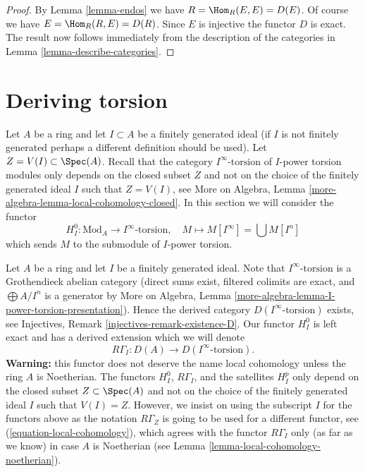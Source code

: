 \begin{proof}
By Lemma \ref{lemma-endos} we have $R = \Hom_R(E, E) = D(E)$.
Of course we have $E = \Hom_R(R, E) = D(R)$. Since $E$ is injective
the functor $D$ is exact. The result now follows immediately from the
description of the categories in
Lemma \ref{lemma-describe-categories}.
\end{proof}




















\section{Deriving torsion}
\label{section-bad-local-cohomology}

\noindent
Let $A$ be a ring and let $I \subset A$ be a finitely generated ideal
(if $I$ is not finitely generated perhaps a different definition
should be used). Let $Z = V(I) \subset \Spec(A)$. Recall that the
category $I^\infty\text{-torsion}$ of $I$-power torsion modules
only depends on the closed subset $Z$ and not on the choice of the
finitely generated ideal $I$ such that $Z = V(I)$, see
More on Algebra, Lemma \ref{more-algebra-lemma-local-cohomology-closed}.
In this section we will consider the functor
$$
H^0_{I} : \text{Mod}_A \longrightarrow I^\infty\text{-torsion},\quad
M \longmapsto M[I^\infty] = \bigcup M[I^n]
$$
which sends $M$ to the submodule of $I$-power torsion.

\medskip\noindent
Let $A$ be a ring and let $I$ be a finitely generated ideal.
Note that $I^\infty\text{-torsion}$ is a Grothendieck
abelian category (direct sums exist, filtered colimits are
exact, and $\bigoplus A/I^n$ is a generator by
More on Algebra, Lemma \ref{more-algebra-lemma-I-power-torsion-presentation}).
Hence the derived category $D(I^\infty\text{-torsion})$ exists, see
Injectives, Remark \ref{injectives-remark-existence-D}.
Our functor $H^0_I$ is left exact and has a derived extension
which we will denote
$$
R\Gamma_I : D(A) \longrightarrow D(I^\infty\text{-torsion}).
$$
{\bf Warning:} this functor does not deserve the name
local cohomology unless the ring $A$ is Noetherian.
The functors $H^0_I$, $R\Gamma_I$, and the satellites $H^p_I$
only depend on the closed subset $Z \subset \Spec(A)$ and not
on the choice of the finitely generated ideal $I$ such that
$V(I) = Z$. However, we insist on using the subscript $I$ for
the functors above as the notation $R\Gamma_Z$ is going
to be used for a different functor, see
(\ref{equation-local-cohomology}), which
agrees with the functor $R\Gamma_I$ only (as far as we know)
in case $A$ is Noetherian
(see Lemma \ref{lemma-local-cohomology-noetherian}).

